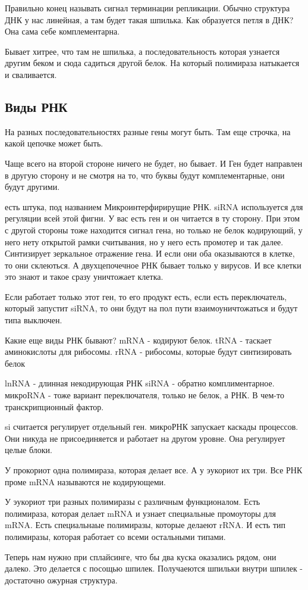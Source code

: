 Правильно конец называть сигнал терминации репликации. Обычно
структура ДНК у нас линейная, а там будет
такая шпилька. Как образуется петля в ДНК? Она
сама себе комплементарна.

Бывает хитрее, что там не шпилька, а последовательность которая
узнается другим беком и сюда садиться другой белок.
На который полимираза натыкается и сваливается.

\subsection{Виды РНК}
На разных последовательностях разные гены могут быть. Там еще строчка,
на какой цепочке может быть.

Чаще всего на второй стороне ничего не будет, но бывает. И Ген будет
направлен в другую сторону и не смотря на то, что буквы будут
комплементарные, они будут другими.

есть штука, под названием Микроинтерфирирущие РНК.
siRNA используется для регуляции всей этой фигни. У вас есть
ген и он читается в ту сторону. При этом с другой стороны тоже
находится сигнал гена, но только не белок кодирующий, у него нету
открытой рамки считывания, но у него есть промотер и так далее.
Синтизирует зеркальное отражение гена. И если
они оба оказываются в клетке, то они склеються. А двухцепочечное
РНК бывает только у вирусов. И все клетки это знают и такое
сразу уничтожает клетка.

Если работает только этот ген, то его продукт есть, если
есть переключатель, который запустит siRNA, то они будут на пол пути
взаимоуничтожаться и будут типа выключен.

Какие еще виды РНК бывают?
mRNA - кодируют белок. 
tRNA - таскает аминокислоты для рибосомы. 
rRNA - рибосомы, которые будут синтизировать белок

lnRNA - длинная некодирующая РНК
siRNA - обратно комплиментарное. 
микроRNA  - тоже вариант переключателя, только не белок, а РНК. В чем-то транскрипционный фактор. 

si считается регулирует отдельный ген. 
микроРНК запускает каскады процессов. Они никуда не присоединяется и работает на другом 
уровне. Она регулирует целые блоки. 

У прокориот одна полимираза, которая делает все. А у эукориот их три. Все РНК проме mRNA
называются не кодирующеми. 

У эукориот три разных полимиразы с различным 
функционалом. Есть полимираза, которая делает mRNA и узнает 
специальные промоуторы для mRNA. Есть специальнаые полимиразы, 
которые делаеют rRNA. И есть тип полимиразы, которая работает со всеми остальными типами. 


Теперь нам нужно при сплайсинге, что бы два куска оказались рядом, они далеко. Это 
делается с посощью шпилек. Получаеются шпильки внутри шпилек - достаточно ожурная структура. 

 



